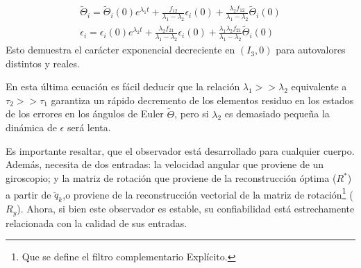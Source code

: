 \documentclass[10pt]{report}
\numberwithin{equation}{chapter}
\numberwithin{algorithm}{chapter}
\begin{document}
\begin{equation}
\begin{array}{c}\label{EcuacionesExponenciales1}
\tilde{\Theta}_i=\tilde{\Theta}_i(0)e^{\lambda_1t}+\frac{f_{12}}{\lambda_1-\lambda_2}\epsilon_i(0)+\frac{\lambda_2f_{12}}{\lambda_1-\lambda_2}\tilde{\Theta}_i(0)\\
\epsilon_i=\epsilon_i(0)e^{\lambda_2t}+\frac{\lambda_2f_{21}}{\lambda_1-\lambda_2}\epsilon_i(0)+\frac{\lambda_1\lambda_2f_{21}}{\lambda_1-\lambda_2}\tilde{\Theta}_i(0)
\end{array}
\end{equation}
Esto demuestra el carácter exponencial decreciente en $(I_3,0)$ para autovalores distintos y reales.\par
En esta última ecuación es fácil deducir que la relación $\lambda_1>>\lambda_2$ equivalente a $\tau_2>>\tau_1$ garantiza un rápido decremento de los elementos residuo en los estados de los errores en los ángulos de Euler $\tilde{\Theta}$, pero si $\lambda_2$ es demasiado pequeña la dinámica de $\epsilon$ será lenta.\par
Es importante resaltar, que el observador está desarrollado para cualquier cuerpo. Además, necesita de dos entradas: la velocidad angular que proviene de un giroscopio; y la matriz de rotación que proviene de la reconstrucción óptima ($R^*$) a partir de $\breve{q}_k$,o proviene de la reconstrucción vectorial de la matriz de rotación\footnote{Que se define el filtro complementario Explícito.} ($R_y$). Ahora, si bien este observador es estable, su confiabilidad está estrechamente relacionada con la calidad de sus entradas.\par
\end{document}
